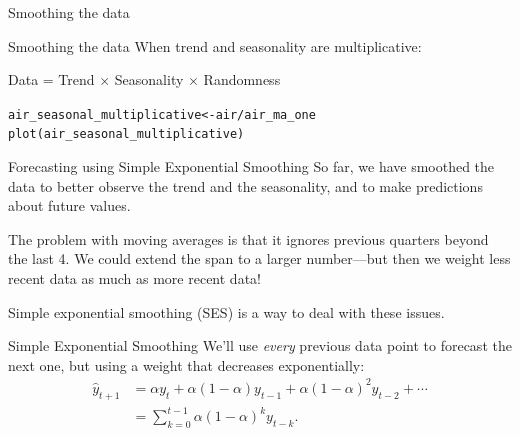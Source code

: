 \documentclass{beamer}\usepackage[]{graphicx}\usepackage[]{color}
\makeatletter
\newcommand{\hlopt}[1]{\textcolor[rgb]{1,0.894,0.769}{#1}}%
\newcommand{\hlstd}[1]{\textcolor[rgb]{1,0.894,0.769}{#1}}%
\newcommand{\hlkwb}[1]{\textcolor[rgb]{0.804,0.776,0.451}{#1}}%
\newcommand{\hlkwd}[1]{\textcolor[rgb]{1,0.78,0.769}{#1}}%
\newenvironment{kframe}{%
 \def\at@end@of@kframe{}%
 \ifinner\ifhmode%
  \def\at@end@of@kframe{\end{minipage}}%
  \begin{minipage}{\columnwidth}%
 \fi\fi%
 \def\FrameCommand##1{\hskip\@totalleftmargin \hskip-\fboxsep
 \colorbox{shadecolor}{##1}\hskip-\fboxsep
     \hskip-\linewidth \hskip-\@totalleftmargin \hskip\columnwidth}%
 \MakeFramed {\advance\hsize-\width
   \@totalleftmargin\z@ \linewidth\hsize
   \@setminipage}}%
 {\par\unskip\endMakeFramed%
 \at@end@of@kframe}
\newenvironment{knitrout}{}{} %
\makeatother
\begin{document}
\begin{darkframes}
\begin{frame}[fragile]{Smoothing the data}
\begin{knitrout}
\end{knitrout}
  
    \end{frame}
    
    
    \begin{frame}[fragile]{Smoothing the data}
      \fontsize{9}{9}\selectfont
        When trend and seasonality are multiplicative:
      \begin{center}
        Data = Trend $\times$ Seasonality $\times$ Randomness
      \end{center}
     
\begin{knitrout}
\begin{kframe}
\begin{alltt}
\hlstd{air_seasonal_multiplicative} \hlkwb{<-} \hlstd{air} \hlopt{/} \hlstd{air_ma_one}
\hlkwd{plot}\hlstd{(air_seasonal_multiplicative)}
\end{alltt}
\end{kframe}


\end{knitrout}
    \lc
    \end{frame}
    
    
    \begin{frame}[fragile]{Forecasting using Simple Exponential Smoothing}
        So far, we have smoothed the data to better observe the trend and the seasonality, and to make predictions about future values.
        \bigskip
        
        The problem with moving averages is that it ignores previous quarters beyond the last 4. We could extend the span to a larger number---but then we weight less recent data as much as more recent data!
        \bigskip

        Simple exponential smoothing (SES) is a way to deal with these issues.
    \end{frame}
    
    
    
    \begin{frame}[fragile]{Simple Exponential Smoothing}
      We'll use \emph{every} previous data point to forecast the next one, but using a weight that decreases exponentially:
      \begin{align*}
        \hat{y}_{t+1} &= \alpha y_t + \alpha (1-\alpha)y_{t-1} + \alpha (1-\alpha)^2 y_{t-2} + \cdots \\
        &= \sum_{k=0}^{t-1} \alpha (1-\alpha)^k y_{t-k}.
      \end{align*}


\end{frame}
\end{darkframes}
\end{document}
